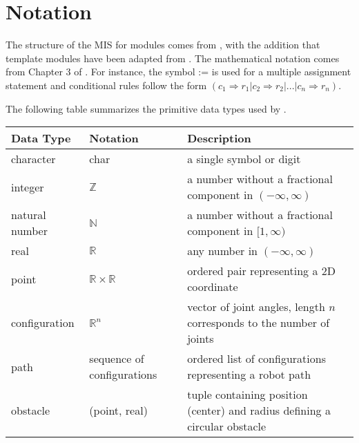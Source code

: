 \documentclass[12pt, titlepage]{article}
\begin{document}


\section{Notation}
The structure of the MIS for modules comes from \citet{HoffmanAndStrooper1995},
with the addition that template modules have been adapted from
\cite{GhezziEtAl2003}.  The mathematical notation comes from Chapter 3 of
\citet{HoffmanAndStrooper1995}.  For instance, the symbol := is used for a
multiple assignment statement and conditional rules follow the form $(c_1
\Rightarrow r_1 | c_2 \Rightarrow r_2 | ... | c_n \Rightarrow r_n )$.

The following table summarizes the primitive data types used by \progname. 

\begin{center}
  \renewcommand{\arraystretch}{1.2}
  \noindent 
  \begin{tabular}{l l p{7.5cm}} 
  \toprule 
  \textbf{Data Type} & \textbf{Notation} & \textbf{Description}\\ 
  \midrule
  character & char & a single symbol or digit\\
  integer & $\mathbb{Z}$ & a number without a fractional component in $(-\infty, \infty)$ \\[4pt]
  natural number & $\mathbb{N}$ & a number without a fractional component in $[1, \infty)$ \\[4pt]
  real & $\mathbb{R}$ & any number in $(-\infty, \infty)$\\[4pt]
  point & $\mathbb{R} \times \mathbb{R}$ & ordered pair representing a 2D coordinate\\[4pt]
  configuration & $\mathbb{R}^n$ & vector of joint angles, length $n$ corresponds to the number of joints\\[4pt]
  path & sequence of configurations & ordered list of configurations representing a robot path\\[4pt]
  obstacle & (point, real) & tuple containing position (center) and radius defining a circular obstacle\\
  \bottomrule
  \end{tabular} 
  \end{center}
\end{document}
